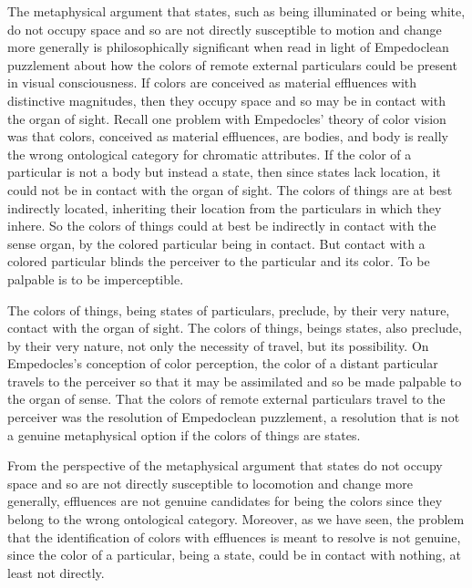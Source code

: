 The metaphysical argument that states, such as being illuminated or being white, do not occupy space and so are not directly susceptible to motion and change more generally is philosophically significant when read in light of Empedoclean puzzlement about how the colors of remote external particulars could be present in visual consciousness. If colors are conceived as material effluences with distinctive magnitudes, then they occupy space and so may be in contact with the organ of sight. Recall one problem with Empedocles' theory of color vision was that colors, conceived as material effluences, are bodies, and body is really the wrong ontological category for chromatic attributes. If the color of a particular is not a body but instead a state, then since states lack location, it could not be in contact with the organ of sight. The colors of things are at best indirectly located, inheriting their location from the particulars in which they inhere. So the colors of things could at best be indirectly in contact with the sense organ, by the colored particular being in contact. But contact with a colored particular blinds the perceiver to the particular and its color. To be palpable is to be imperceptible.

The colors of things, being states of particulars, preclude, by their very nature, contact with the organ of sight. The colors of things, beings states, also preclude, by their very nature, not only the necessity of travel, but its possibility. On Empedocles's conception of color perception, the color of a distant particular travels to the perceiver so that it may be assimilated and so be made palpable to the organ of sense. That the colors of remote external particulars travel to the perceiver was the resolution of Empedoclean puzzlement, a resolution that is not a genuine metaphysical option if the colors of things are states. 

From the perspective of the metaphysical argument that states do not occupy space and so are not directly susceptible to locomotion and change more generally, effluences are not genuine candidates for being the colors since they belong to the wrong ontological category. Moreover, as we have seen, the problem that the identification of colors with effluences is meant to resolve is not genuine, since the color of a particular, being a state, could be in contact with nothing, at least not directly.

